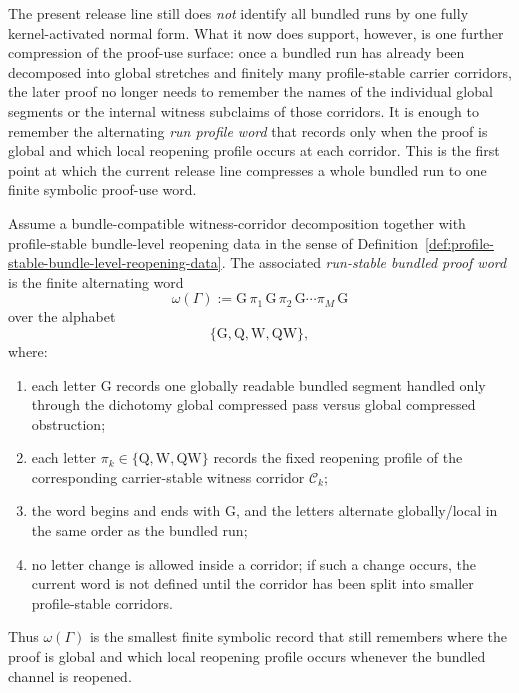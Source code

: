 \begin{remark}
\label{rem:status-of-the-first-profile-to-run-compression-step}
The present release line still does \emph{not} identify all bundled runs by one fully kernel-activated normal form. What it now does support, however, is one further compression of the proof-use surface: once a bundled run has already been decomposed into global stretches and finitely many profile-stable carrier corridors, the later proof no longer needs to remember the names of the individual global segments or the internal witness subclaims of those corridors. It is enough to remember the alternating \emph{run profile word} that records only when the proof is global and which local reopening profile occurs at each corridor. This is the first point at which the current release line compresses a whole bundled run to one finite symbolic proof-use word.
\end{remark}

\begin{definition}
\label{def:run-stable-bundled-proof-word}
Assume a bundle-compatible witness-corridor decomposition together with profile-stable bundle-level reopening data in the sense of Definition~\ref{def:profile-stable-bundle-level-reopening-data}. The associated \emph{run-stable bundled proof word} is the finite alternating word
\[
\omega(\Gamma):=\mathrm{G}\,\pi_1\,\mathrm{G}\,\pi_2\,\mathrm{G}\cdots \pi_M\,\mathrm{G}
\]
over the alphabet
\[
\{\mathrm{G},\mathrm{Q},\mathrm{W},\mathrm{QW}\},
\]
where:
\begin{enumerate}[leftmargin=2em,label=(\roman*)]
\item each letter $\mathrm{G}$ records one globally readable bundled segment handled only through the dichotomy global compressed pass versus global compressed obstruction;
\item each letter $\pi_k\in\{\mathrm{Q},\mathrm{W},\mathrm{QW}\}$ records the fixed reopening profile of the corresponding carrier-stable witness corridor $\mathcal C_k$;
\item the word begins and ends with $\mathrm{G}$, and the letters alternate globally/local in the same order as the bundled run;
\item no letter change is allowed inside a corridor; if such a change occurs, the current word is not defined until the corridor has been split into smaller profile-stable corridors.
\end{enumerate}
Thus $\omega(\Gamma)$ is the smallest finite symbolic record that still remembers where the proof is global and which local reopening profile occurs whenever the bundled channel is reopened.
\end{definition}

